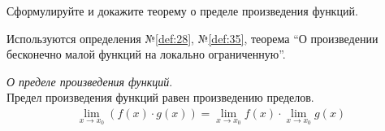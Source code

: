 \begin{question}
    Сформулируйте и докажите теорему о пределе произведения функций.
\end{question}
\begin{used}
    Используются определения №\ref{def:28}, №\ref{def:35}, теорема ``О произведении бесконечно малой функций на локально ограниченную''.
\end{used}
\begin{theorem}
    \textit{О пределе произведения функций}. \\
    Предел произведения функций равен произведению пределов.
    \begin{gather*}
        \lim_{x \to x_0} (f(x) \cdot g(x)) = \lim_{x \to x_0} f(x) \cdot \lim_{x \to x_0} g(x)
    \end{gather*}
\end{theorem}
